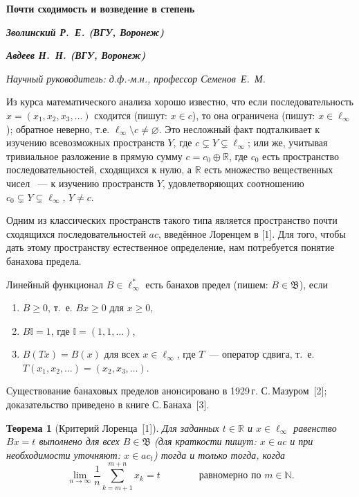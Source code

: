 \documentclass[14pt, a4paper]{extbook}
\newtheorem{theorem}{Теорема}
\begin{document}
\begin{center}%
\textbf{\large{} Почти сходимость и возведение в степень} %

\textit{\textbf{Зволинский Р.~Е. (ВГУ, Воронеж)}} %

\textit{\textbf{Авдеев Н.~Н. (ВГУ, Воронеж)}} %

\textit{Научный руководитель: д.ф.-м.н., профессор Семенов~Е.~М.} %
\end{center}


Из курса математического анализа хорошо известно,
что если последовательность $x=(x_1, x_2, x_3, ...)$ сходится
(пишут: $x\in c$), то она ограничена (пишут: $x\in \ell_\infty$);
обратное неверно, т.е. $\ell_\infty\setminus c \ne \varnothing$.
Это несложный факт подталкивает к изучению всевозможных пространств $Y$, где $c \subsetneq Y \subsetneq \ell_\infty$;
или же, учитывая тривиальное разложение в прямую сумму $c=c_0 \oplus \mathbb R$,
где $c_0$ есть пространство последовательностей, сходящихся к нулю,
а $\mathbb R$ есть множество вещественных чисел ~---
к изучению пространств $Y$, удовлетворяющих соотношению $c_0 \subsetneq Y \subsetneq \ell_\infty$, $Y\ne c$.

Одним из классических пространств такого типа является пространство почти сходящихся последовательностей $ac$,
введённое Лоренцем в [1].
Для того, чтобы дать этому пространству естественное определение, нам потребуется понятие банахова предела.

	Линейный функционал $B\in \ell_\infty^*$ есть банахов предел (пишем: $B \in \mathfrak{B}$),
	если
	\begin{enumerate}
		\item
			$B\geq0$, т.~е. $Bx \geq 0$ для $x \geq 0$,
		\item
			$B\mathbb{I}=1$, где $\mathbb{I} =(1,1,\ldots)$,
		\item
			$B(Tx)=B(x)$ для всех $x\in \ell_\infty$, где $T$~---
			оператор сдвига, т.~е. $T(x_1,x_2,\ldots)=(x_2,x_3,\ldots)$.
	\end{enumerate}

Существование банаховых пределов анонсировано в 1929\,г. С.\,Мазуром~[2];
доказательство приведено в книге С.\,Банаха~[3].

\begin{theorem}[{Критерий Лоренца~[1]}]
	Для заданных $t\in\mathbb R$ и $x\in\ell_\infty$ равенство $Bx=t$ выполнено для всех $B\in\mathfrak{B}$
	(для краткости пишут: $x\in ac$ и при необходимости уточняют: $x\in ac_t$)
	тогда и только тогда, когда
	\begin{equation*}
		\label{eq:crit_Lorentz}
		\lim_{n\to\infty} \frac{1}{n} \sum_{k=m+1}^{m+n} x_k = t
		\qquad\qquad\mbox{равномерно по $m\in\mathbb N$.}
	\end{equation*}
\end{theorem}
\end{document}
